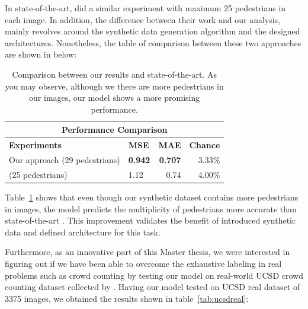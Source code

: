 \noindent In state-of-the-art, \citet{segui2015learning} did a similar experiment with maximum 25 pedestrians in each image. In addition, the difference between their work and our analysis, mainly revolves around the synthetic data generation algorithm and the designed architectures. Nonetheless, the table of comparison between these two approaches are shown in below:
 
\begin{table}[H]
\centering
\small\sffamily
\begin{tabular}{llrr}
\multicolumn{4}{c}{\textbf{\textbf{Performance Comparison}}} \\
\bottomrule
\textbf{Experiments} &\textbf{MSE} &\textbf{MAE}& \textbf{Chance} \\
\bottomrule
Our approach (29 pedestrians)                  & \textbf{0.942}   &  \textbf{0.707}        & 3.33\% \\
\citet{segui2015learning} (25 pedestrians)     & 1.12       & 0.74     & 4.00\% \\
\bottomrule
\end{tabular}
\caption{Comparison between our results and state-of-the-art. As you may observe, although we there are more pedestrians in our images, our model shows a more promising performance.  }
\label{tab:tab}
\end{table} 

Table~\ref{tab:tab} shows that even though our synthetic dataset contains more pedestrians in images, the model predicts the multiplicity of pedestrians more accurate than state-of-the-art \cite{segui2015learning}. This improvement validates the benefit of introduced synthetic data and defined architecture for this task. 

\noindent Furthermore, as an innovative part of this Master thesis, we were interested in figuring out if we have been able to overcome the exhaustive labeling in real problems such as crowd counting by testing our model on real-world UCSD crowd counting dataset collected by \citet{chan2008privacy}. Having our model tested on UCSD real dataset of 3375 images, we obtained the results shown in table~\ref{tab:ucsdreal}:

%
%
%

